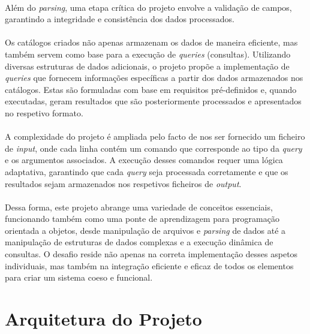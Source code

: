 \documentclass{article}
\begin{document}
\paragraph{}Além do \textit{parsing}, uma etapa crítica do projeto envolve a validação de campos, garantindo a integridade e consistência dos dados processados.
\vspace{-0.3cm}
\paragraph{}Os catálogos criados não apenas armazenam os dados de maneira eficiente, mas também servem como base para a execução de \textit{queries} (consultas). Utilizando diversas estruturas de dados adicionais, o projeto propõe a implementação de \textit{queries} que fornecem informações específicas a partir dos dados armazenados nos catálogos. Estas são formuladas com base em requisitos pré-definidos e, quando executadas, geram resultados que são posteriormente processados e apresentados no respetivo formato.
\vspace{-0.3cm}  
\paragraph{}A complexidade do projeto é ampliada pelo facto de nos ser fornecido um ficheiro de \textit{input}, onde cada linha contém um comando que corresponde ao tipo da \textit{query} e os argumentos associados. A execução desses comandos requer uma lógica adaptativa, garantindo que cada \textit{query} seja processada corretamente e que os resultados sejam armazenados nos respetivos ficheiros de \textit{output}.
\vspace{-0.3cm}
\paragraph{}Dessa forma, este projeto abrange uma variedade de conceitos essenciais, funcionando também como uma ponte de aprendizagem para programação orientada a objetos, desde manipulação de arquivos e \textit{parsing} de dados até a manipulação de estruturas de dados complexas e a execução dinâmica de consultas. O desafio reside não apenas na correta implementação desses aspetos individuais, mas também na integração eficiente e eficaz de todos os elementos para criar um sistema coeso e funcional.

\section{Arquitetura do Projeto}
\end{document}
